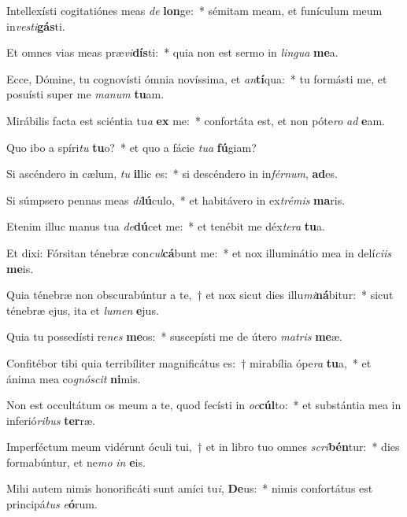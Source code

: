 \item Intellexísti cogitatiónes meas \textit{de} \textbf{lon}ge:~* sémitam meam, et funículum meum in\textit{ves}\textit{ti}\textbf{gás}ti.
\item Et omnes vias meas præ\textit{vi}\textbf{dís}ti:~* quia non est sermo in \textit{lin}\textit{gua} \textbf{me}a.
\item Ecce, Dómine, tu cognovísti ómnia novíssima, et \textit{an}\textbf{tí}qua:~* tu formásti me, et posuísti super me \textit{ma}\textit{num} \textbf{tu}am.
\item Mirábilis facta est sciéntia tu\textit{a} \textbf{ex} me:~* confortáta est, et non póte\textit{ro} \textit{ad} \textbf{e}am.
\item Quo ibo a spíri\textit{tu} \textbf{tu}o?~* et quo a fácie \textit{tu}\textit{a} \textbf{fú}giam?
\item Si ascéndero in cælum, \textit{tu} \textbf{il}lic es:~* si descéndero in in\textit{fér}\textit{num}, \textbf{ad}es.
\item Si súmpsero pennas meas \textit{di}\textbf{lú}culo,~* et habitávero in ex\textit{tré}\textit{mis} \textbf{ma}ris.
\item Etenim illuc manus tua \textit{de}\textbf{dú}cet me:~* et tenébit me déx\textit{te}\textit{ra} \textbf{tu}a.
\item Et dixi: Fórsitan ténebræ con\textit{cul}\textbf{cá}bunt me:~* et nox illuminátio mea in delí\textit{ci}\textit{is} \textbf{me}is.
\item Quia ténebræ non obscurabúntur a te,~† et nox sicut dies illu\textit{mi}\textbf{ná}bitur:~* sicut ténebræ ejus, ita et \textit{lu}\textit{men} \textbf{e}jus.
\item Quia tu possedísti re\textit{nes} \textbf{me}os:~* suscepísti me de útero \textit{ma}\textit{tris} \textbf{me}æ.
\item Confitébor tibi quia terribíliter magnificátus es:~† mirabília ópe\textit{ra} \textbf{tu}a,~* et ánima mea co\textit{gnó}\textit{scit} \textbf{ni}mis.
\item Non est occultátum os meum a te, quod fecísti in \textit{oc}\textbf{cúl}to:~* et substántia mea in inferió\textit{ri}\textit{bus} \textbf{ter}ræ.
\item Imperféctum meum vidérunt óculi tui,~† et in libro tuo omnes \textit{scri}\textbf{bén}tur:~* dies formabúntur, et ne\textit{mo} \textit{in} \textbf{e}is.
\item Mihi autem nimis honorificáti sunt amíci tu\textit{i}, \textbf{De}us:~* nimis confortátus est principá\textit{tus} \textit{e}\textbf{ó}rum.
